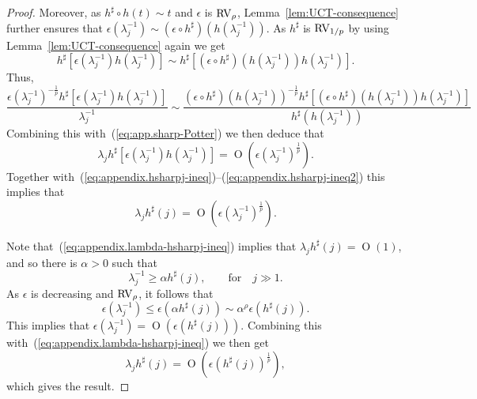 \documentclass[10pt, a4paper]{amsart}
\newcommand{\op}{\operatorname}
\numberwithin{equation}{section}
\theoremstyle{definition}
\theoremstyle{remark}
\newcommand{\RV}{\textup{RV}}
\begin{document}
\begin{proof}
Moreover, as $h^\sharp \circ h(t)\sim t$ and $\epsilon$ is $\RV_\rho$, Lemma~\ref{lem:UCT-consequence} further ensures that 
$\epsilon(\lambda_j^{-1})\sim (\epsilon\circ h^\sharp)(h(\lambda_j^{-1}))$. As $h^\sharp$ is $\RV_{1/p}$ by using Lemma~\ref{lem:UCT-consequence} again we get
\begin{equation*}
 h^\sharp[ \epsilon(\lambda_j^{-1})h(\lambda_j^{-1})]\sim  h^\sharp\left[ (\epsilon\circ h^\sharp)\left(h(\lambda_j^{-1})\right)h(\lambda_j^{-1})\right]. 
\end{equation*}
 Thus, 
 \begin{equation*}
 \frac{\epsilon(\lambda_j^{-1})^{-\frac1p} h^\sharp\left[ \epsilon(\lambda_j^{-1})h(\lambda_j^{-1})\right]}{\lambda_j^{-1}} \sim 
 \frac{ (\epsilon\circ h^\sharp)(h(\lambda_j^{-1}))^{-\frac1p} h^\sharp\left[ (\epsilon\circ h^\sharp)\left(h(\lambda_j^{-1})\right)h(\lambda_j^{-1})\right]}{h^\sharp (h(\lambda_j^{-1}))}
\end{equation*}
Combining this with~(\ref{eq:app.sharp-Potter}) we then deduce that
\begin{equation*}
 \lambda_j h^\sharp\left[ \epsilon(\lambda_j^{-1})h(\lambda_j^{-1})\right] =\op{O}\left(\epsilon(\lambda_j^{-1})^{\frac1p}\right). 
\end{equation*}
Together with~(\ref{eq:appendix.hsharpj-ineq})--(\ref{eq:appendix.hsharpj-ineq2}) this implies that
\begin{equation}\label{eq:appendix.lambda-hsharpj-ineq}
\lambda_jh^\sharp(j)=\op{O}\left(\epsilon(\lambda_j^{-1})^{\frac1p}\right).
\end{equation}

Note that~(\ref{eq:appendix.lambda-hsharpj-ineq})  implies that $\lambda_jh^\sharp(j)=\op{O}(1)$, and so there is $\alpha>0$ such that
\begin{equation*}
\lambda_j^{-1}\geq \alpha h^\sharp(j), \qquad \text{for}\quad j\gg 1.
\end{equation*}
As $\epsilon$ is decreasing and $\RV_\rho$, it follows that
\begin{equation*}
\epsilon\left(\lambda_j^{-1}\right)\leq \epsilon(\alpha h^\sharp(j))\sim \alpha^\rho \epsilon(h^\sharp (j)).
\end{equation*}
This implies that $ \epsilon(\lambda_j^{-1})=\op{O}(\epsilon(h^\sharp (j)))$. Combining this with~(\ref{eq:appendix.lambda-hsharpj-ineq}) we then get
\begin{equation*}
 \lambda_jh^\sharp(j)=\op{O}\left(\epsilon\left(h^\sharp(j)\right)^{\frac1p}\right), 
\end{equation*}
which gives the result. 
\end{proof}
\end{document}
